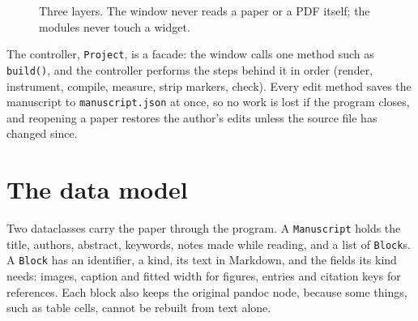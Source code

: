 \documentclass[11pt,a4paper,oneside,openany]{book}
\newcommand{\code}[1]{\texttt{#1}}
\begin{document}
\begin{figure}[htbp]
\centering
{}
\caption{Three layers. The window never reads a paper or a PDF itself; the modules never touch a widget.}
\label{fig:arch}
\end{figure}

The controller, \code{Project}, is a facade: the window calls one method such as \code{build()}, and the
controller performs the steps behind it in order (render, instrument, compile, measure, strip markers,
check). Every edit method saves the manuscript to \code{manuscript.json} at once, so no work is lost if the
program closes, and reopening a paper restores the author's edits unless the source file has changed since.

\section{The data model}
Two dataclasses carry the paper through the program. A \code{Manuscript} holds the title, authors, abstract,
keywords, notes made while reading, and a list of \code{Block}s. A \code{Block} has an identifier, a kind,
its text in Markdown, and the fields its kind needs: images, caption and fitted width for figures, entries
and citation keys for references. Each block also keeps the original pandoc node, because some things,
such as table cells, cannot be rebuilt from text alone.
\end{document}
